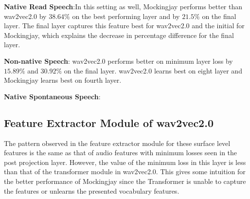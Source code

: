 \documentclass[sigconf]{acmart}
\newcommand{\wv}{wav2vec2.0\xspace}
\newcommand{\mj}{Mockingjay\xspace}
\begin{document}
\textbf{Native Read Speech}:In this setting as well, Mockingjay performs better than wav2vec2.0 by $38.64\%$ on the best performing layer and by $21.5\%$ on the final layer. The final layer captures this feature best for {\wv} and the initial for {\mj}, which explains the decrease in percentage difference for the final layer. 

\textbf{Non-native Speech}:
{\wv} performs better on minimum layer loss by $15.89\%$ and $30.92\%$ on the final layer. {\wv} learns best on eight layer and {\mj} learns best on fourth layer.

\textbf{Native Spontaneous Speech}:
\subsection{Feature Extractor Module of {\wv}} 
\label{Feature Extractor Module of wav2vec2.0 text features}
The pattern observed in the feature extractor module for these surface level features is the same as that of audio features with minimum losses seen in the post projection layer. However, the value of the minimum loss in this layer is less than that of the transformer module in wav2vec2.0. This gives some intuition for the better performance of Mockingjay since the Transformer is unable to capture the features or unlearns the presented vocabulary features.

\end{document}
